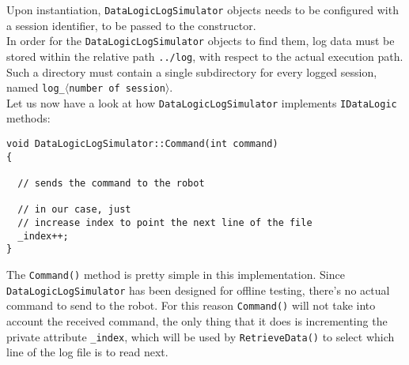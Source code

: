 Upon instantiation, \texttt{DataLogicLogSimulator} objects needs to be 
configured with a session identifier, to be passed to 
the constructor. 
\\
In order for the \texttt{DataLogicLogSimulator} objects to find them, 
log data must be stored within the relative path 
\texttt{../log}, with respect to the actual execution path.
Such a directory must contain a single subdirectory for every 
logged session, named \texttt{log\_$\langle$number of session$\rangle$}. 
\\
Let us now have a look at how \texttt{DataLogicLogSimulator} implements 
\texttt{IDataLogic} methods:

\begin{lstlisting}[caption={\texttt{DataLogic::Command() method}}, label={code:command_method}, frame=trBL]
void DataLogicLogSimulator::Command(int command) 
{

  // sends the command to the robot

  // in our case, just 
  // increase index to point the next line of the file
  _index++;
}
\end{lstlisting}

The \texttt{Command()} method is pretty simple in this 
implementation. Since \texttt{DataLogicLogSimulator} has been designed 
for offline testing, there's no actual command to send to the robot.
For this reason \texttt{Command()} will not take into account
the received command, the only thing that it does is 
incrementing the private attribute \texttt{\_index}, which 
will be used by \texttt{RetrieveData()} to select which line 
of the log file is to read next.

